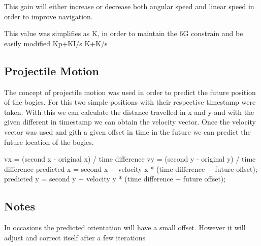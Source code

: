 This gain will either increase or decrease both angular speed and linear speed in order to improve navigation. \begin{DoxyVerb}This value was simplifies as K, in order to maintain the 6G constrain and be easily modified 
Kp+KI/s
K+K/s
\end{DoxyVerb}
\hypertarget{index_ac_doc_Projectile_Motion}{}\subsection{Projectile Motion}\label{index_ac_doc_Projectile_Motion}
The concept of projectile motion was used in order to predict the future position of the bogies. For this two simple positions with their respective timestamp were taken. With this we can calculate the distance travelled in x and y and with the given different in timestamp we can obtain the velocity vector. Once the velocity vector was used and gith a given offset in time in the future we can predict the future location of the bogies. \begin{DoxyVerb}vx = (second x - original x) /  time difference
vy = (second y - original y) /  time difference
predicted x = second x + velocity x * (time difference + future offset);
predicted y = second y + velocity y * (time difference + future offset);
\end{DoxyVerb}
\hypertarget{index_Notes}{}\subsection{Notes}\label{index_Notes}
In occasions the predicted orientation will have a small offset. However it will adjust and correct itself after a few iterations 